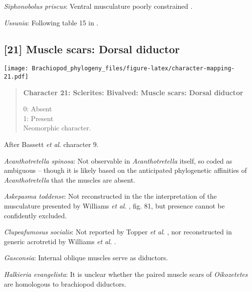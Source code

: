 \documentclass[openany]{book}
\theoremstyle{definition}
\theoremstyle{definition}
\theoremstyle{definition}
\theoremstyle{remark}
\begin{document}
\hypertarget{Siphonobolus_priscus-coding-20}{}
\emph{Siphonobolus priscus}: Ventral musculature poorly constrained
\citep{Williams2000LinguliformeaCraniiformea, Popov2009Earlyontogeny}.

\hypertarget{Ussunia-coding-20}{}
\emph{Ussunia}: Following table 15 in
\citet{Williams2000LinguliformeaCraniiformea}.

\subsection*{{[}21{]} Muscle scars: Dorsal
diductor}\label{muscle-scars-dorsal-diductor}

\texttt{[image: Brachiopod\_phylogeny\_files/figure-latex/character-mapping-21.pdf]}

\begin{quote}
\textbf{Character 21: Sclerites: Bivalved: Muscle scars: Dorsal
diductor}

0: Absent\\
1: Present\\
Neomorphic character.
\end{quote}

After Bassett \emph{et al}.
\citeyearpar{Bassett2001Functionalmorphology} character 9.

\hypertarget{Acanthotretella_spinosa-coding-21}{}
\emph{Acanthotretella spinosa}: Not observable in \emph{Acanthotretella}
itself, so coded as ambiguous -- though it is likely based on the
anticipated phylogenetic affinities of \emph{Acanthotretella} that the
muscles are absent.

\hypertarget{Askepasma_toddense-coding-21}{}
\emph{Askepasma toddense}: Not reconstructed in the the interpretation
of the musculature presented by Williams \emph{et al}.
\citeyearpar{Williams2000LinguliformeaCraniiformea}, fig. 81, but
presence cannot be confidently excluded.

\hypertarget{Clupeafumosus_socialis-coding-21}{}
\emph{Clupeafumosus socialis}: Not reported by Topper \emph{et al}.
\citeyearpar{Topper2013Reappraisalof}, nor reconstructed in generic
acrotretid by Williams \emph{et al}.
\citeyearpar{Williams2000LinguliformeaCraniiformea}.

\hypertarget{Gasconsia-coding-21}{}
\emph{Gasconsia}: Internal oblique muscles serve as diductors.

\hypertarget{Halkieria_evangelista-coding-21}{}
\emph{Halkieria evangelista}: It is unclear whether the paired muscle
scars of \emph{Oikozetetes} are homologous to brachiopod diductors.
\end{document}

